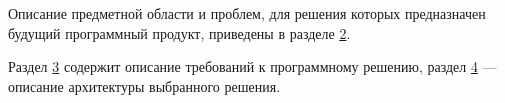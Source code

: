 		Описание предметной области и проблем, для решения которых предназначен будущий программный продукт, приведены в разделе \hyperref[chapter2]{2}.
	
		\bigskip
		
		Раздел \hyperref[chapter3]{3} содержит описание требований к программному решению, раздел \hyperref[chapter4]{4} --- описание архитектуры выбранного решения.
